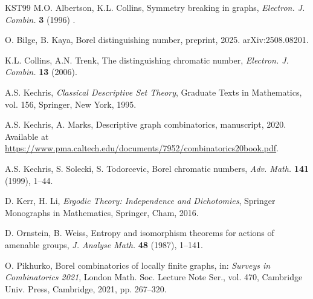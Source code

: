 \documentclass[11pt, reqno, a4paper]{amsart}
\theoremstyle{plain}
\theoremstyle{definition}
\theoremstyle{remark}
\begin{document}
\begin{thebibliography}{KST99}
M.O. Albertson, K.L. Collins, 
Symmetry breaking in graphs, 
\textit{Electron. J. Combin.} \textbf{3} (1996) .


O. Bilge, B. Kaya, 
 Borel distinguishing number, 
preprint, 2025. arXiv:2508.08201.


K.L. Collins, A.N. Trenk, 
The distinguishing chromatic number, 
\textit{Electron. J. Combin.} \textbf{13} (2006).

A.S. Kechris,
\textit{Classical Descriptive Set Theory},
Graduate Texts in Mathematics, vol. 156, Springer, New York, 1995.

A.S. Kechris, A. Marks, 
Descriptive graph combinatorics, 
manuscript, 2020. Available at \url{https://www.pma.caltech.edu/documents/7952/combinatorics20book.pdf}.

A.S. Kechris, S. Solecki, S. Todorcevic, 
Borel chromatic numbers, 
\textit{Adv. Math.} \textbf{141} (1999), 1--44.



D. Kerr, H. Li, 
\textit{Ergodic Theory: Independence and Dichotomies}, 
Springer Monographs in Mathematics, Springer, Cham, 2016.

D. Ornstein, B. Weiss,
Entropy and isomorphism theorems for actions of amenable groups,
\textit{J. Analyse Math.} \textbf{48} (1987), 1--141.

O. Pikhurko, 
Borel combinatorics of locally finite graphs, 
in: \textit{Surveys in Combinatorics 2021}, London Math. Soc. Lecture Note Ser., vol. 470, Cambridge Univ. Press, Cambridge, 2021, pp. 267--320.
\end{thebibliography}
\end{document}
